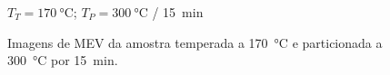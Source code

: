 \begin{figure}
  \centering
  $T_T = \SI{170}{\degreeCelsius}$; $T_P = \SI{300}{\degreeCelsius}$ / \SI{15}{min}\\
  \quad
  \quad
  \caption{Imagens de MEV da amostra temperada a \SI{170}{\degreeCelsius} e particionada a \SI{300}{\degreeCelsius} por 15~min.}
  \label{fig:TP300-15min_MEV}
\end{figure}

